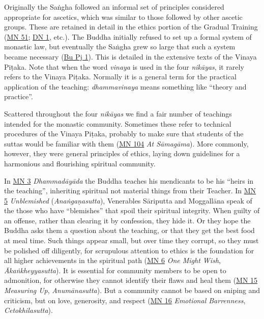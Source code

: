 \documentclass[12pt,openany]{book}%
\begin{document}
Originally the \textsanskrit{Saṅgha} followed an informal set of principles considered appropriate for ascetics, which was similar to those followed by other ascetic groups. These are retained in detail in the ethics portion of the Gradual Training (\href{https://suttacentral.net/mn51}{MN 51}; \href{https://suttacentral.net/dn1}{DN 1}, etc.). The Buddha initially refused to set up a formal system of monastic law, but eventually the \textsanskrit{Saṅgha} grew so large that such a system became necessary (\href{https://suttacentral.net/pli{-}tv{-}bu{-}vb{-}pj1}{Bu Pj 1}). This is detailed in the extensive texts of the Vinaya \textsanskrit{Piṭaka}. Note that when the word \textit{vinaya} is used in the four \textit{\textsanskrit{nikāyas}}, it rarely refers to the Vinaya \textsanskrit{Piṭaka}. Normally it is a general term for the practical application of the teaching: \textit{dhammavinaya} means something like “theory and practice”.

Scattered throughout the four \textit{\textsanskrit{nikāyas}} we find a fair number of teachings intended for the monastic community. Sometimes these refer to technical procedures of the Vinaya \textsanskrit{Piṭaka}, probably to make sure that students of the suttas would be familiar with them (\href{https://suttacentral.net/mn104}{MN 104} \textit{At \textsanskrit{Sāmagāma}}). More commonly, however, they were general principles of ethics, laying down guidelines for a harmonious and flourishing spiritual community.

In \href{https://suttacentral.net/mn3}{MN 3} \textit{\textsanskrit{Dhammadāyāda}} the Buddha teaches his mendicants to be his “heirs in the teaching”, inheriting spiritual not material things from their Teacher. In \href{https://suttacentral.net/mn5}{MN 5} \textit{Unblemished} (\textit{\textsanskrit{Anaṅgaṇasutta}}), Venerables \textsanskrit{Sāriputta} and \textsanskrit{Moggallāna} speak of the those who have “blemishes” that spoil their spiritual integrity. When guilty of an offense, rather than clearing it by confession, they hide it. Or they hope the Buddha asks them a question about the teaching, or that they get the best food at meal time. Such things appear small, but over time they corrupt, so they must be polished off diligently, for scrupulous attention to ethics is the foundation for all higher achievements in the spiritual path (\href{https://suttacentral.net/mn6}{MN 6} \textit{One Might Wish}, \textit{\textsanskrit{Ākaṅkheyyasutta}}). It is essential for community members to be open to admonition, for otherwise they cannot identify their flaws and heal them (\href{https://suttacentral.net/mn15}{MN 15} \textit{Measuring Up}, \textit{\textsanskrit{Anumānasutta}}). But a community cannot be based on sniping and criticism, but on love, generosity, and respect (\href{https://suttacentral.net/mn16}{MN 16} \textit{Emotional Barrenness}, \textit{Cetokhilasutta}).
\end{document}
